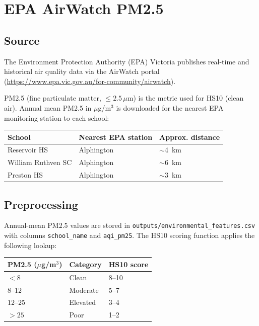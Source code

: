 \documentclass[11pt,a4paper,openany]{book}
\begin{document}
\section{EPA AirWatch PM2.5}

\subsection{Source}

The Environment Protection Authority (EPA) Victoria publishes real-time and historical air quality data via the AirWatch portal (\url{https://www.epa.vic.gov.au/for-community/airwatch}).

PM2.5 (fine particulate matter, $\leq 2.5\,\mu$m) is the metric used for HS10 (clean air). Annual mean PM2.5 in $\mu$g/m$^3$ is downloaded for the nearest EPA monitoring station to each school:

\begin{center}
\begin{tabular}{L{4cm} L{4cm} C{3cm}}
\toprule
\textbf{School} & \textbf{Nearest EPA station} & \textbf{Approx. distance} \\
\midrule
Reservoir HS       & Alphington     & $\sim$4~km \\
William Ruthven SC & Alphington     & $\sim$6~km \\
Preston HS         & Alphington     & $\sim$3~km \\
\bottomrule
\end{tabular}
\end{center}

\subsection{Preprocessing}

Annual-mean PM2.5 values are stored in \texttt{outputs/environmental\_features.csv} with columns \texttt{school\_name} and \texttt{aqi\_pm25}. The HS10 scoring function applies the following lookup:

\begin{center}
\begin{tabular}{C{3cm} C{3cm} C{3cm}}
\toprule
\textbf{PM2.5 ($\mu$g/m$^3$)} & \textbf{Category} & \textbf{HS10 score} \\
\midrule
$< 8$          & Clean    & 8--10 \\
$8$--$12$      & Moderate & 5--7  \\
$12$--$25$     & Elevated & 3--4  \\
$> 25$         & Poor     & 1--2  \\
\bottomrule
\end{tabular}
\end{center}
\end{document}
